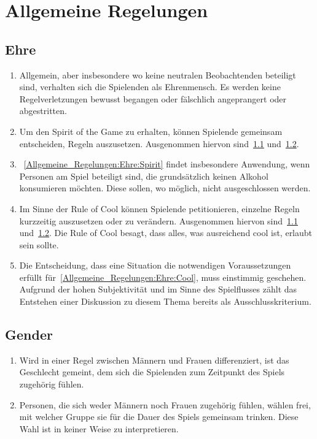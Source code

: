\chapter{Allgemeine Regelungen}\label{Allgemeine_Regelungen}

\section{Ehre}\label{Allgemeine_Regelungen:Ehre}
\begin{enumerate}[label={(\arabic*)}]
	\item\label{Allgemeine_Regelungen:Ehre:Ehrenmensch}
	Allgemein, aber insbesondere wo keine neutralen Beobachtenden beteiligt sind, verhalten sich die Spielenden als Ehrenmensch.
	Es werden keine Regelverletzungen bewusst begangen oder fälschlich angeprangert oder abgestritten.
	
	\item\label{Allgemeine_Regelungen:Ehre:Spirit}
	Um den \glqq{}Spirit of the Game\grqq{} zu erhalten, können Spielende gemeinsam entscheiden, Regeln auszusetzen.
	Ausgenommen hiervon sind~\ref{Allgemeine_Regelungen:Ehre} und~\ref{Allgemeine_Regelungen:Gender}.
	
	\item
~\ref{Allgemeine_Regelungen:Ehre:Spirit} findet insbesondere Anwendung, wenn Personen am Spiel beteiligt sind, die grundsätzlich keinen Alkohol konsumieren möchten.
	Diese sollen, wo möglich, nicht ausgeschlossen werden.
	
	\item\label{Allgemeine_Regelungen:Ehre:Cool}
	Im Sinne der \glqq{}Rule of Cool\grqq{} können Spielende petitionieren, einzelne Regeln kurzzeitig auszusetzen oder zu verändern.
	Ausgenommen hiervon sind~\ref{Allgemeine_Regelungen:Ehre} und~\ref{Allgemeine_Regelungen:Gender}.
	Die Rule of Cool besagt, dass alles, was ausreichend cool ist, erlaubt sein sollte.

	\item
	Die Entscheidung, dass eine Situation die notwendigen Voraussetzungen erfüllt für~\ref{Allgemeine_Regelungen:Ehre:Cool}, muss einstimmig geschehen.
	Aufgrund der hohen Subjektivität und im Sinne des Spielflusses zählt das Entstehen einer Diskussion zu diesem Thema bereits als Ausschlusskriterium.
\end{enumerate}

\section{Gender}\label{Allgemeine_Regelungen:Gender}
\begin{enumerate}[label={(\arabic*)}]	
	\item
	Wird in einer Regel zwischen Männern und Frauen differenziert, ist das Geschlecht gemeint, dem sich die Spielenden zum Zeitpunkt des Spiels zugehörig fühlen.
	
	\item
	Personen, die sich weder Männern noch Frauen zugehörig fühlen, wählen frei, mit welcher Gruppe sie für die Dauer des Spiels gemeinsam trinken.
	Diese Wahl ist in keiner Weise zu interpretieren.
\end{enumerate}
	
